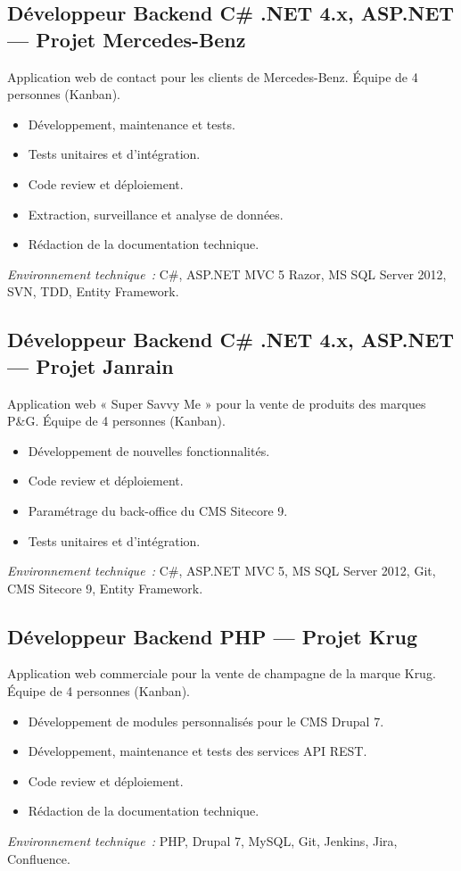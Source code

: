 \documentclass[10pt,a4paper]{article}
\begin{document}
\vspace{6pt}

\subsection*{Développeur Backend C\# .NET 4.x, ASP.NET --- Projet Mercedes-Benz}
\color{darkgray}
Application web de contact pour les clients de Mercedes-Benz. Équipe de 4 personnes (Kanban).
\begin{itemize}
  \item Développement, maintenance et tests.
  \item Tests unitaires et d'intégration.
  \item Code review et déploiement.
  \item Extraction, surveillance et analyse de données.
  \item Rédaction de la documentation technique.
\end{itemize}
\textit{Environnement technique~:} C\#, ASP.NET MVC 5 Razor, MS SQL Server 2012, SVN, TDD, Entity Framework.

\vspace{6pt}

\subsection*{Développeur Backend C\# .NET 4.x, ASP.NET --- Projet Janrain}
\color{darkgray}
Application web « Super Savvy Me » pour la vente de produits des marques P\&G. Équipe de 4 personnes (Kanban).
\begin{itemize}
  \item Développement de nouvelles fonctionnalités.
  \item Code review et déploiement.
  \item Paramétrage du back-office du CMS Sitecore 9.
  \item Tests unitaires et d'intégration.
\end{itemize}
\textit{Environnement technique~:} C\#, ASP.NET MVC 5, MS SQL Server 2012, Git, CMS Sitecore 9, Entity Framework.

\vspace{6pt}

\subsection*{Développeur Backend PHP --- Projet Krug}
\color{darkgray}
Application web commerciale pour la vente de champagne de la marque Krug. Équipe de 4 personnes (Kanban).
\begin{itemize}
  \item Développement de modules personnalisés pour le CMS Drupal 7.
  \item Développement, maintenance et tests des services API REST.
  \item Code review et déploiement.
  \item Rédaction de la documentation technique.
\end{itemize}
\textit{Environnement technique~:} PHP, Drupal 7, MySQL, Git, Jenkins, Jira, Confluence.
\end{document}
